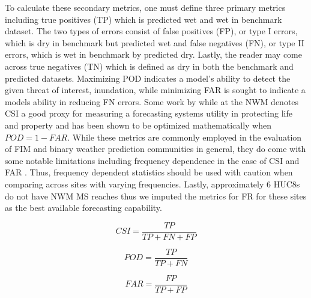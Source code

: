 To calculate these secondary metrics, one must define three primary metrics including true positives (TP) which is predicted wet and wet in benchmark dataset.
The two types of errors consist of false positives (FP), or type I errors, which is dry in benchmark but predicted wet and false negatives (FN), or type II errors, which is wet in benchmark by predicted dry. 
Lastly, the reader may come across true negatives (TN) which is defined as dry in both the benchmark and predicted datasets.
Maximizing POD indicates a model's ability to detect the given threat of interest, inundation, while minimizing FAR is sought to indicate a models ability in reducing FN errors.
Some work by  while at the NWM denotes CSI a good proxy for measuring a forecasting systems utility in protecting life and property and has been shown to be optimized mathematically when $POD = 1 - FAR$.
While these metrics are commonly employed in the evaluation of FIM and binary weather prediction communities in general, they do come with some notable limitations including frequency dependence in the case of CSI and FAR \cite{gerapetritis2004behavior,stephens2014problems,schaefer1990critical,jolliffe2012forecast}.
Thus, frequency dependent statistics should be used with caution when comparing across sites with varying frequencies. 
Lastly, approximately 6 HUC8s do not have NWM MS reaches thus we imputed the metrics for FR for these sites as the best available forecasting capability.
%
\begin{linenomath*}
\begin{equation}
\label{eq:csi}
CSI = \frac{TP}{TP + FN + FP}
\end{equation}
\end{linenomath*}
%
\begin{linenomath*}
\begin{equation}
\label{eq:pod}
POD = \frac{TP}{TP + FN}
\end{equation}
\end{linenomath*}
%
\begin{linenomath*}
\begin{equation}
\label{eq:far}
FAR = \frac{FP}{TP + FP}
\end{equation}
\end{linenomath*}
%
